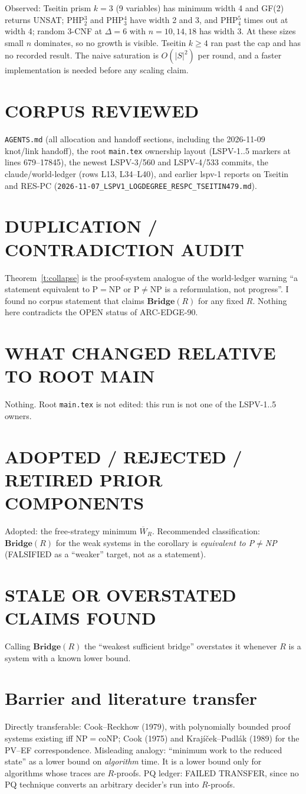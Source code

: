 \documentclass[11pt]{article}
\theoremstyle{definition}\newtheorem{definition}[theorem]{Definition}
\begin{document}
Observed: Tseitin prism $k=3$ (9 variables) has minimum width 4 and GF(2) returns UNSAT; PHP$^{3}_2$ and PHP$^{4}_3$ have width 2 and 3,
and PHP$^{5}_4$ times out at width 4; random 3-CNF at $\Delta=6$ with $n=10,14,18$ has width 3. At these sizes small $n$ dominates, so no
growth is visible. Tseitin $k\ge4$ ran past the cap and has no recorded result. The naive saturation is $O(|S|^2)$ per round, and a faster
implementation is needed before any scaling claim.

\section*{CORPUS REVIEWED}
\texttt{AGENTS.md} (all allocation and handoff sections, including the 2026-11-09 knot/link handoff), the root \texttt{main.tex}
ownership layout (LSPV-1..5 markers at lines 679--17845), the newest LSPV-3/560 and LSPV-4/533 commits, the claude/world-ledger (rows L13, L34--L40),
and earlier lspv-1 reports on Tseitin and RES-PC (\texttt{2026-11-07\_LSPV1\_LOGDEGREE\_RESPC\_TSEITIN479.md}).
\section*{DUPLICATION / CONTRADICTION AUDIT}
Theorem~\ref{t:collapse} is the proof-system analogue of the world-ledger warning ``a statement equivalent to P$=$NP or P$\ne$NP is a
reformulation, not progress''. I found no corpus statement that claims $\mathbf{Bridge}(R)$ for any fixed $R$. Nothing here contradicts the
OPEN status of ARC-EDGE-90.
\section*{WHAT CHANGED RELATIVE TO ROOT MAIN}
Nothing. Root \texttt{main.tex} is not edited: this run is not one of the LSPV-1..5 owners.
\section*{ADOPTED / REJECTED / RETIRED PRIOR COMPONENTS}
Adopted: the free-strategy minimum $\overline W_R$. Recommended classification: $\mathbf{Bridge}(R)$ for the weak systems in the corollary is
\emph{equivalent to P$\ne$NP} (FALSIFIED as a ``weaker'' target, not as a statement).
\section*{STALE OR OVERSTATED CLAIMS FOUND}
Calling $\mathbf{Bridge}(R)$ the ``weakest sufficient bridge'' overstates it whenever $R$ is a system with a known lower bound.

\section*{Barrier and literature transfer}
Directly transferable: Cook--Reckhow (1979), with polynomially bounded proof systems existing iff NP$=$coNP; Cook (1975) and
Krajíček--Pudlák (1989) for the PV--EF correspondence. Misleading analogy: ``minimum work to the reduced state'' as a lower bound
on \emph{algorithm} time. It is a lower bound only for algorithms whose traces are $R$-proofs. PQ ledger: FAILED TRANSFER, since no
PQ technique converts an arbitrary decider's run into $R$-proofs.
\end{document}
